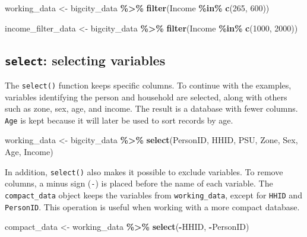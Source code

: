 \documentclass[
  english,
  12pt,
]{book}
\newenvironment{Shaded}{\begin{snugshade}}{\end{snugshade}}
\newcommand{\DecValTok}[1]{\textcolor[rgb]{0.00,0.00,0.81}{#1}}
\newcommand{\FunctionTok}[1]{\textcolor[rgb]{0.13,0.29,0.53}{\textbf{#1}}}
\newcommand{\NormalTok}[1]{#1}
\newcommand{\OtherTok}[1]{\textcolor[rgb]{0.56,0.35,0.01}{#1}}
\newcommand{\SpecialCharTok}[1]{\textcolor[rgb]{0.81,0.36,0.00}{\textbf{#1}}}
\begin{document}
\begin{Shaded}
\begin{Highlighting}[]
\NormalTok{working\_data }\OtherTok{\textless{}{-}}\NormalTok{ bigcity\_data }\SpecialCharTok{\%\textgreater{}\%}
  \FunctionTok{filter}\NormalTok{(Income }\SpecialCharTok{\%in\%} \FunctionTok{c}\NormalTok{(}\DecValTok{265}\NormalTok{, }\DecValTok{600}\NormalTok{))}

\NormalTok{income\_filter\_data }\OtherTok{\textless{}{-}}\NormalTok{ bigcity\_data }\SpecialCharTok{\%\textgreater{}\%}
  \FunctionTok{filter}\NormalTok{(Income }\SpecialCharTok{\%in\%} \FunctionTok{c}\NormalTok{(}\DecValTok{1000}\NormalTok{, }\DecValTok{2000}\NormalTok{))}
\end{Highlighting}
\end{Shaded}

\subsection{\texorpdfstring{\texttt{select}: selecting variables}{select: selecting variables}}\label{select-seleccionar-variables}

The \texttt{select()} function keeps specific columns. To continue with the examples, variables identifying the person and household are selected, along with others such as zone, sex, age, and income. The result is a database with fewer columns. \texttt{Age} is kept because it will later be used to sort records by age.

\begin{Shaded}
\begin{Highlighting}[]
\NormalTok{working\_data }\OtherTok{\textless{}{-}}\NormalTok{ bigcity\_data }\SpecialCharTok{\%\textgreater{}\%}
  \FunctionTok{select}\NormalTok{(PersonID, HHID, PSU, Zone, Sex, Age, Income)}
\end{Highlighting}
\end{Shaded}

In addition, \texttt{select()} also makes it possible to exclude variables. To remove columns, a minus sign (\texttt{-}) is placed before the name of each variable. The \texttt{compact\_data} object keeps the variables from \texttt{working\_data}, except for \texttt{HHID} and \texttt{PersonID}. This operation is useful when working with a more compact database.

\begin{Shaded}
\begin{Highlighting}[]
\NormalTok{compact\_data }\OtherTok{\textless{}{-}}\NormalTok{ working\_data }\SpecialCharTok{\%\textgreater{}\%}
  \FunctionTok{select}\NormalTok{(}\SpecialCharTok{{-}}\NormalTok{HHID, }\SpecialCharTok{{-}}\NormalTok{PersonID)}
\end{Highlighting}
\end{Shaded}
\end{document}
